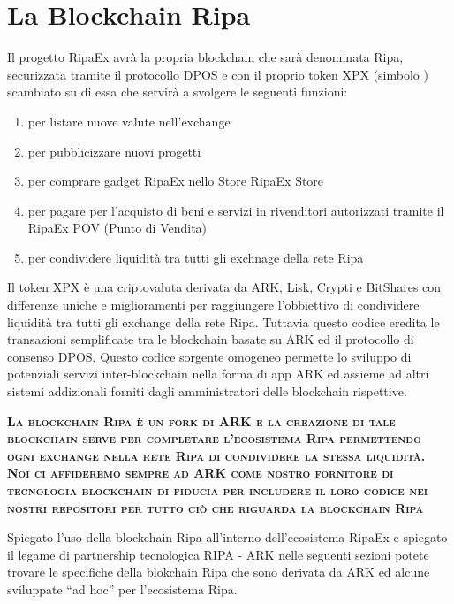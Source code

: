 \documentclass[11pt,fleqn]{book} %
\begin{document}
\chapter{La Blockchain Ripa}
\label{sec:theRipaBlockchain}
Il progetto RipaEx avrà la propria blockchain che sarà denominata Ripa, securizzata tramite il protocollo DPOS e
con il proprio token XPX (simbolo \PHP) scambiato su di essa che servirà a svolgere le seguenti funzioni:
	\begin{enumerate}
		\item per listare nuove valute nell'exchange
		\item per pubblicizzare nuovi progetti
		\item per comprare gadget RipaEx nello Store RipaEx Store
		\item per pagare per l'acquisto di beni e servizi in rivenditori autorizzati tramite il RipaEx POV (Punto di Vendita)
		\item per condividere liquidità tra tutti gli exchnage della rete Ripa
	\end{enumerate}

Il token XPX è una criptovaluta derivata da ARK, Lisk, Crypti e BitShares con differenze uniche e miglioramenti per 
raggiungere l'obbiettivo di condividere liquidità tra tutti gli exchange della rete Ripa. Tuttavia questo codice eredita
le transazioni semplificate tra le blockchain basate su ARK ed il protocollo di consenso DPOS. Questo codice sorgente omogeneo 
permette lo sviluppo di potenziali servizi inter-blockchain nella forma di app ARK ed assieme ad altri sistemi addizionali
forniti dagli amministratori delle blockchain rispettive.

\vspace{5mm}
\textsc{\textbf{La blockchain Ripa è un fork di ARK e la creazione di tale blockchain serve per completare l'ecosistema Ripa
permettendo ogni exchange nella rete Ripa di condividere la stessa liquidità. Noi ci affideremo sempre ad ARK come nostro
fornitore di tecnologia blockchain di fiducia per includere il loro codice nei nostri repositori
per tutto ciò che riguarda la blockchain Ripa}}

\vspace{5mm}

Spiegato l'uso della blockchain Ripa all'interno dell'ecosistema RipaEx e spiegato il legame di partnership tecnologica
RIPA - ARK nelle seguenti sezioni potete trovare le specifiche della blokchain Ripa che sono derivata da ARK ed alcune sviluppate 
``ad hoc'' per l'ecosistema Ripa.
\end{document}
